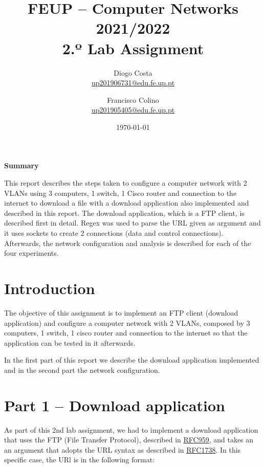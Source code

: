 \documentclass[a4paper,11pt,english]{article}
\begin{document}

\author{
    Diogo Costa\\
    \href{mailto:up201906731@edu.fe.up.pt}{up201906731@edu.fe.up.pt}
    \and
    Francisco Colino\\
    \href{mailto:up201905405@edu.fe.up.pt}{up201905405@edu.fe.up.pt}
}
\title{FEUP -- Computer Networks \large 2021/2022 \\ \large 2.º Lab Assignment}
\date{\today}
\maketitle

\begin{center}
    \textbf{Summary}
\end{center}

    This report describes the steps taken to configure a computer network with 2 VLANs using 3 computers,
    1 switch, 1 Cisco router and connection to the internet to download a file with a download
    application also implemented and described in this report.
    The download application, which is a FTP client, is described first in detail. Regex was used to
    parse the URL given as argument and it uses sockets to create 2 connections (data and control connections).
    Afterwards, the network configuration and analysis is described for each of the four experiments.


\section{Introduction}
    The objective of this assignment is to implement an FTP client (download application) and
    configure a computer network with 2 VLANs, composed by 3 computers, 1 switch, 1 cisco router
    and connection to the internet so that the application can be tested in it afterwards.

    In the first part of this report we describe the download application implemented and in
    the second part the network configuration.



\section{Part 1 -- Download application}
    As part of this 2nd lab assignment, we had to implement a download application that uses
    the FTP (File Transfer Protocol), described in \href{https://www.rfc-editor.org/info/rfc959}{RFC959},
    and takes an an argument that adopts the URL syntax as described in
    \href{https://www.rfc-editor.org/info/rfc1738}{RFC1738}. In this specific case, the URl is in the
    following format:
    
\end{document}
